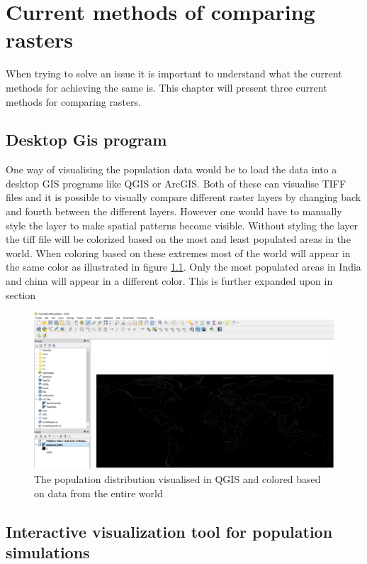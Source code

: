 \chapter{Current methods of comparing rasters}

When trying to solve an issue it is important to understand what the current methods for achieving the same is. This chapter will present three current methods for comparing rasters.

\section{Desktop Gis program}

One way of visualising the population data would be to load the data into a desktop GIS programs like QGIS or ArcGIS. Both of these can visualise TIFF files and it is possible to visually compare different raster layers by changing back and fourth between the different layers. However one would have to manually style the layer to make spatial patterns become visible. Without styling the layer the tiff file will be colorized based on the most and least populated areas in the world. When coloring based on these extremes most of the world will appear in the same color as illustrated in figure \ref{QGIS}. Only the most populated areas in India and china will appear in a different color. This is further expanded upon in section 

\begin{figure} [H]
	\centering
	\includegraphics[width=.8\textwidth]{Pictures/QGIS}
	\caption{The population distribution visualised in QGIS and colored based on data from the entire world}
	\label{QGIS}
\end{figure}

\section{Interactive visualization tool for population simulations}

